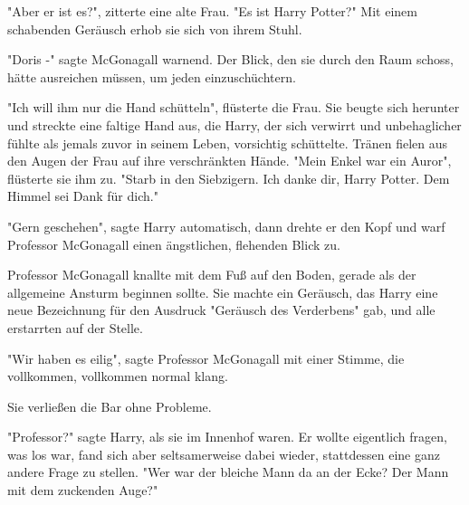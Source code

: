 "Aber er ist es?", zitterte eine alte Frau. "Es ist Harry Potter?" Mit einem schabenden Geräusch erhob sie sich von ihrem Stuhl. 

"Doris -" sagte McGonagall warnend. Der Blick, den sie durch den Raum schoss, hätte ausreichen müssen, um jeden einzuschüchtern.

"Ich will ihm nur die Hand schütteln", flüsterte die Frau. Sie beugte sich herunter und streckte eine faltige Hand aus, die Harry, der sich verwirrt und unbehaglicher fühlte als jemals zuvor in seinem Leben, vorsichtig schüttelte. Tränen fielen aus den Augen der Frau auf ihre verschränkten Hände. "Mein Enkel war ein Auror", flüsterte sie ihm zu. "Starb in den Siebzigern. Ich danke dir, Harry Potter. Dem Himmel sei Dank für dich."

"Gern geschehen", sagte Harry automatisch, dann drehte er den Kopf und warf Professor McGonagall einen ängstlichen, flehenden Blick zu. 

Professor McGonagall knallte mit dem Fuß auf den Boden, gerade als der allgemeine Ansturm beginnen sollte. Sie machte ein Geräusch, das Harry eine neue Bezeichnung für den Ausdruck "Geräusch des Verderbens" gab, und alle erstarrten auf der Stelle. 

"Wir haben es eilig", sagte Professor McGonagall mit einer Stimme, die vollkommen, vollkommen normal klang.

Sie verließen die Bar ohne Probleme.

"Professor?" sagte Harry, als sie im Innenhof waren. Er wollte eigentlich fragen, was los war, fand sich aber seltsamerweise dabei wieder, stattdessen eine ganz andere Frage zu stellen. "Wer war der bleiche Mann da an der Ecke? Der Mann mit dem zuckenden Auge?" 

